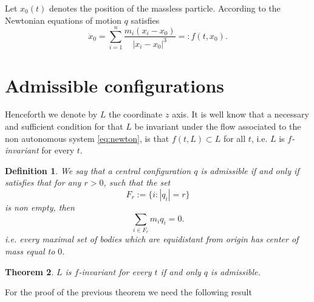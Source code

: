 \documentclass[twoside]{article}
\newtheorem{thm}{Theorem}[section]
\newtheorem{defi}[thm]{Definition}
\theoremstyle{remark}
\begin{document}
Let $x_0(t)$ denotes the position of the massless particle.
According to the Newtonian equations of motion $q$ satisfies
\begin{equation}\label{eq:newton}
 \ddot{x}_0=\sum_{i=1}^n\frac{m_i(x_i-x_0)}{|x_i-x_0|^3}=:f(t,x_0).
\end{equation}





\section{Admissible configurations}\label{sec:admisible.configuraciones}
Henceforth we denote by $L$ the coordinate $z$ axis.
It is well know that a  necessary and sufficient condition for that $L$ be invariant under the  flow associated to the non autonomous system  \eqref{eq:newton}, is that $f(t,L)\subset L$ for all $t$, i.e. $L$ is \emph{$f$-invariant} for every $t$.


\begin{defi}
We say that a
central configuration $q$ is \emph{admissible} if and only if satisfies that for any $r>0$, such that the set
\[F_r:=\{i:|q_i|=r\}\]
is non empty, then
\begin{equation}\label{eq:suma0}\sum_{i\in F_r}m_iq_i=0.\end{equation}
i.e. every maximal set of  bodies which are equidistant from origin has center of mass equal to $0$.
\end{defi}



\begin{thm}\label{thm:prim} $L$ is $f$-invariant for every $t$ if and only  $q$ is admissible.
\end{thm}

For the proof of the previous theorem we need the following result
\end{document}
